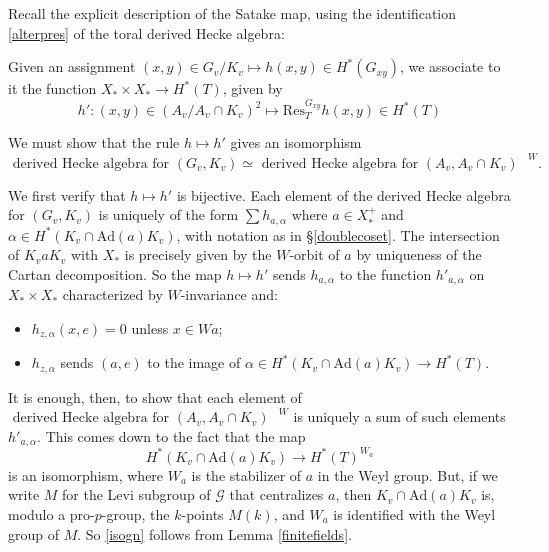 \documentclass[10pt]{amsart}
\newcommand{\Ad}{\mathrm{Ad}}
\theoremstyle{remark}
\begin{document}
 
 Recall the explicit description of the Satake map, using the identification
 \eqref{alterpres} of the toral derived Hecke algebra: 
 
 Given an assignment
 $(x,y) \in G_v/K_v \mapsto h(x,y) \in H^*(G_{xy})$, we associate
 to it the  function  $X_* \times X_* \longrightarrow H^*(T)$, given by 
 $$h': (x,y) \in (A_v/A_v \cap K_v)^2 \mapsto \mathrm{Res}^{G_{xy}}_{T} h(x,y) \in H^*(T)$$
 
 
 
 We must show that  the rule
 $h \mapsto h'$ gives  an isomorphism
   \begin{equation} \mbox{ derived Hecke algebra for $(G_v, K_v)$} 
  \simeq \mbox{ derived Hecke algebra for $(A_v, A_v \cap K_v)$ }^W.
  \end{equation}
 
  
 


We  first verify that $h \mapsto h'$ is bijective. Each element of  the derived Hecke algebra  for $(G_v, K_v)$ is  uniquely of the form $\sum h_{a, \alpha}$
  where $a \in X_*^+$ and $\alpha \in H^*(K_v \cap \Ad(a) K_v)$, with notation as in \S \ref{doublecoset}. 
The intersection of $K_v a K_v$ with $X_*$
  is precisely given by the $W$-orbit of $a$ by uniqueness of the Cartan decomposition. 
  So the map $h \mapsto h'$ sends $h_{a, \alpha}$ to the  function $h'_{a, \alpha}$ on $X_* \times X_*$
  characterized by $W$-invariance and:  
   \begin{itemize}
  \item[(i)]$h_{z,\alpha}(x,e) = 0$ unless    $x \in W a$; 
  \item[(ii)]  $h_{z,\alpha}$ sends   $ (a, e) $ to  the image of $\alpha \in H^*(K_v \cap \Ad(a) K_v) \rightarrow H^*(T)$. 
  \end{itemize}
    It is enough, then, to show that each element of  $\mbox{ derived Hecke algebra for $(A_v, A_v \cap K_v)$ }^W$
  is uniquely a sum of such elements $h'_{a,\alpha}$.  This comes down to the fact that the map
\begin{equation} \label{isogn} H^*(K_v \cap \Ad(a) K_v) \longrightarrow  H^*(T)^{W_a} \end{equation}
  is an isomorphism, where $W_a$ is the stabilizer of $a$ in the Weyl group. 
  But, if we write $M$ for the Levi subgroup of $\mathcal{G}$
  that centralizes $a$, then $K_v \cap \Ad(a) K_v$ is, modulo a pro-$p$-group,
  the $k$-points $M(k)$, and $W_a$ is identified with the Weyl group of $M$. 
  So \eqref{isogn} follows from Lemma \ref{finitefields}. 
 
\end{document}
